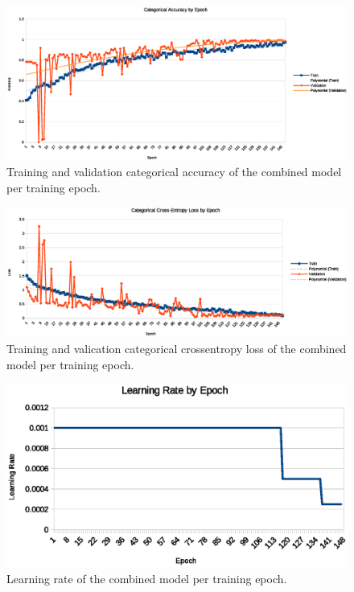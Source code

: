 \begin{figure}[h!]
    \includegraphics[width=\linewidth]{Figures/EpochAccuracy1}
    \centering
    \caption{Training and validation categorical accuracy of the combined model per training epoch.}
    \label{fig:categorical_accuracy}
\end{figure}

\begin{figure}[h!]
    \includegraphics[width=\linewidth]{Figures/EpochLoss1}
    \centering
    \caption{Training and valication categorical crossentropy loss of the combined model per training epoch.}
    \label{fig:categorical_loss}
\end{figure}

\begin{figure}[h!]
    \includegraphics[width=\linewidth]{Figures/EpochLearningRate1}
    \centering
    \caption{Learning rate of the combined model per training epoch.}
    \label{fig:learning_rate}
\end{figure}

